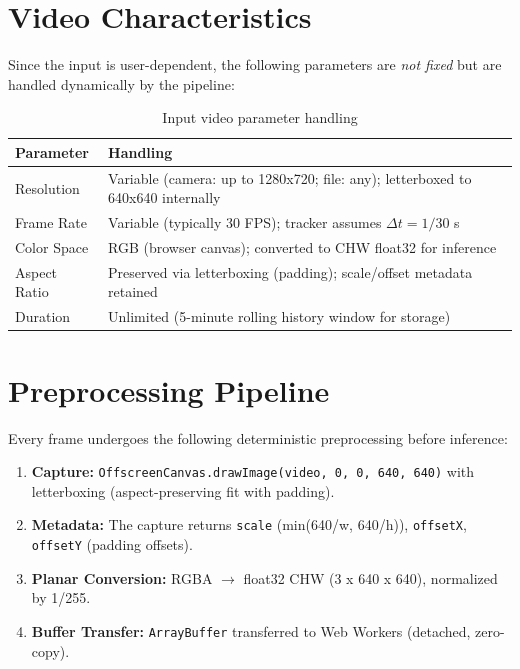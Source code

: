 \section{Video Characteristics}
\label{sec:video-characteristics}

Since the input is user-dependent, the following parameters are \textit{not fixed} but are handled dynamically by the pipeline:

\begin{table}[htbp]
\centering
\caption{Input video parameter handling}
\label{tab:video-params}
\begin{tabular}{@{}ll@{}}
\toprule
\textbf{Parameter} & \textbf{Handling} \\
\midrule
Resolution & Variable (camera: up to 1280x720; file: any); letterboxed to 640x640 internally \\
Frame Rate & Variable (typically 30 FPS); tracker assumes $\Delta t = 1/30$ s \\
Color Space & RGB (browser canvas); converted to CHW float32 for inference \\
Aspect Ratio & Preserved via letterboxing (padding); scale/offset metadata retained \\
Duration & Unlimited (5-minute rolling history window for storage) \\
\bottomrule
\end{tabular}
\end{table}

\section{Preprocessing Pipeline}
\label{sec:preprocessing}

Every frame undergoes the following deterministic preprocessing before inference:

\begin{enumerate}
    \item \textbf{Capture:} \texttt{OffscreenCanvas.drawImage(video, 0, 0, 640, 640)} with letterboxing (aspect-preserving fit with padding).
    \item \textbf{Metadata:} The capture returns \texttt{scale} (min(640/w, 640/h)), \texttt{offsetX}, \texttt{offsetY} (padding offsets).
    \item \textbf{Planar Conversion:} RGBA $\to$ float32 CHW (3 x 640 x 640), normalized by 1/255.
    \item \textbf{Buffer Transfer:} \texttt{ArrayBuffer} transferred to Web Workers (detached, zero-copy).
\end{enumerate}

